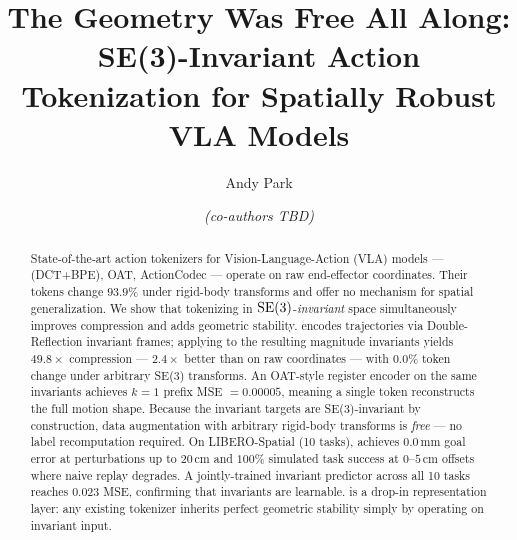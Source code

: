 \documentclass{article}
\title{The Geometry Was Free All Along:\\
       SE(3)-Invariant Action Tokenization for Spatially Robust VLA Models}
\author{Andy Park \and \textit{(co-authors TBD)}}
\begin{document}
\maketitle

\begin{abstract}
State-of-the-art action tokenizers for Vision-Language-Action (VLA) models ---
\fast{} (DCT+BPE), OAT, ActionCodec --- operate on raw end-effector
coordinates. Their tokens change $93.9\%$ under rigid-body transforms and
offer no mechanism for spatial generalization.
We show that tokenizing in $\mathrm{SE}(3)$-\emph{invariant} space simultaneously
improves compression and adds geometric stability.
\dhb{} encodes trajectories via Double-Reflection invariant frames; applying
\fast{} to the resulting magnitude invariants yields $\mathbf{49.8\times}$
compression --- $\mathbf{2.4\times}$ better than \fast{} on raw coordinates ---
with $\mathbf{0.0\%}$ token change under arbitrary SE(3) transforms.
An OAT-style register encoder on the same invariants achieves
$k{=}1$ prefix MSE $= 0.00005$, meaning a single token reconstructs the full
motion shape.
Because the invariant targets are SE(3)-invariant by construction, data
augmentation with arbitrary rigid-body transforms is \emph{free} --- no label
recomputation required.
On LIBERO-Spatial (10 tasks), \dhb{} achieves $0.0\,\text{mm}$ goal error at
perturbations up to $20\,\text{cm}$ and $100\%$ simulated task success at
$0$--$5\,\text{cm}$ offsets where naive replay degrades.
A jointly-trained invariant predictor across all 10 tasks reaches
$0.023$ MSE, confirming that invariants are learnable.
\dhb{} is a drop-in representation layer: any existing tokenizer inherits
perfect geometric stability simply by operating on invariant input.
\end{abstract}








\end{document}
